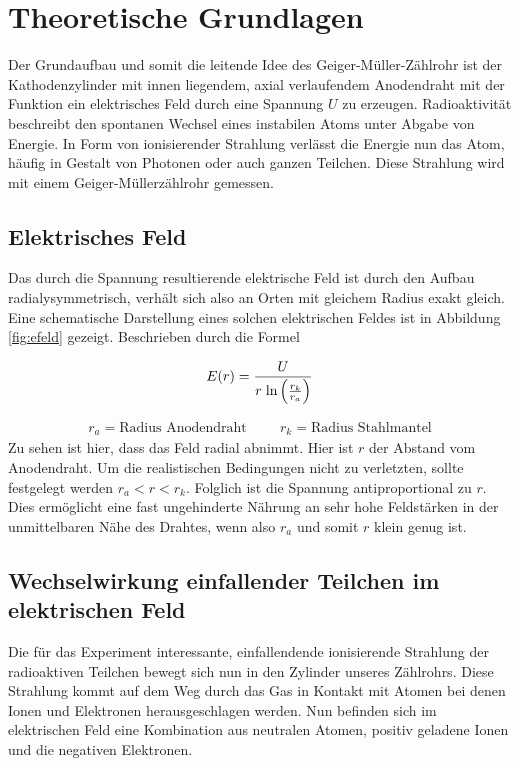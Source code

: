 
\section{Theoretische Grundlagen}
Der Grundaufbau und somit die leitende Idee des Geiger-Müller-Zählrohr ist der Kathodenzylinder %
mit innen liegendem, axial verlaufendem Anodendraht mit der Funktion ein elektrisches Feld durch eine Spannung $U$ zu erzeugen.
Radioaktivität beschreibt den spontanen Wechsel eines instabilen Atoms unter Abgabe von Energie. In Form von ionisierender Strahlung verlässt die Energie nun das Atom, häufig in Gestalt von Photonen oder auch ganzen Teilchen.
Diese Strahlung wird mit einem Geiger-Müllerzählrohr gemessen.

\subsection{Elektrisches Feld}
Das durch die Spannung resultierende elektrische Feld ist durch den Aufbau radialysymmetrisch, verhält sich also an Orten mit gleichem Radius exakt gleich.
Eine schematische Darstellung eines solchen elektrischen Feldes ist in Abbildung \ref{fig:efeld} gezeigt.
Beschrieben durch die Formel 

\begin{equation}  %
\label{eqn:efeld}
E(r) = \frac{U}{r \hspace{0.1cm} \text{ln} \left( \frac{r_k}{r_a} \right) }
\end{equation}

\begin{align*}
r_a = \text{Radius Anodendraht}     \hspace{1cm} r_k = \text{Radius Stahlmantel}
\end{align*}
Zu sehen ist hier, dass das Feld radial abnimmt. Hier ist $r$ der Abstand vom Anodendraht.
Um die realistischen Bedingungen nicht zu verletzten, sollte festgelegt werden $r_a<r<r_k$.
Folglich ist die Spannung antiproportional zu $r$. Dies ermöglicht eine fast ungehinderte Nährung an sehr hohe Feldstärken in der unmittelbaren Nähe des Drahtes, wenn also $r_a$ und somit $r$ klein genug ist. 

\subsection{Wechselwirkung einfallender Teilchen im elektrischen Feld} %
Die für das Experiment interessante, einfallendende ionisierende Strahlung der radioaktiven Teilchen bewegt sich nun in den Zylinder unseres Zählrohrs.
Diese Strahlung kommt auf dem Weg durch das Gas in Kontakt mit Atomen bei denen Ionen und Elektronen herausgeschlagen werden. 
Nun befinden sich im elektrischen Feld eine Kombination aus neutralen Atomen, positiv geladene Ionen und die negativen Elektronen. 

